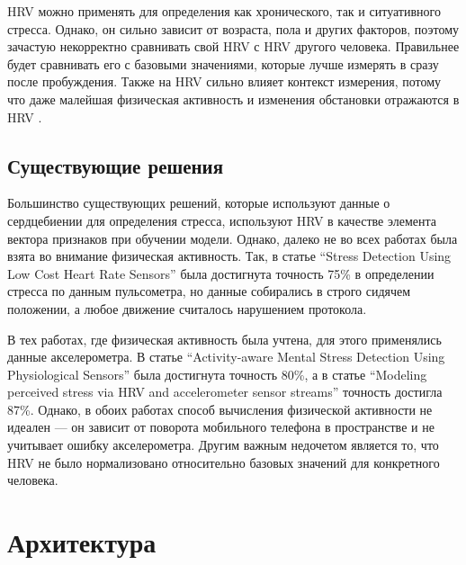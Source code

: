 \documentclass[14pt]{matmex-diploma-custom}
\begin{document}
HRV можно применять для определения как хронического, так и ситуативного
стресса. Однако, он сильно зависит от возраста, пола и других факторов, поэтому
зачастую некорректно сравнивать свой HRV с HRV другого человека. Правильнее
будет сравнивать его с базовыми значениями, которые лучше измерять в сразу после
пробуждения. Также на HRV сильно влияет контекст измерения, потому что даже
малейшая физическая активность и изменения обстановки отражаются в HRV
\cite{article:hrv_reliability}.

\subsection{Существующие решения}
Большинство существующих решений, которые используют данные о сердцебиении для
определения стресса, используют HRV в качестве элемента вектора признаков при
обучении модели. Однако, далеко не во всех работах была взята во внимание
физическая активность. Так, в статье ``Stress Detection Using Low Cost Heart
Rate Sensors'' \cite{article:cheap_hrm} была достигнута точность 75\% в
определении стресса по данным пульсометра, но данные собирались в строго сидячем
положении, а любое движение считалось нарушением протокола.

В тех работах, где физическая активность была учтена, для этого применялись
данные акселерометра. В статье ``Activity-aware Mental Stress Detection Using
Physiological Sensors'' \cite{article:accelerometer_hrv_1} была достигнута
точность 80\%, а в статье ``Modeling perceived stress via HRV and accelerometer
sensor streams'' \cite{article:accelerometer_hrv_2} точность достигла 87\%.
Однако, в обоих работах способ вычисления физической активности не идеален ---
он зависит от поворота мобильного телефона в пространстве и не учитывает ошибку
акселерометра. Другим важным недочетом является то, что HRV не было
нормализовано относительно базовых значений для конкретного человека.

\section{Архитектура}
\end{document}
